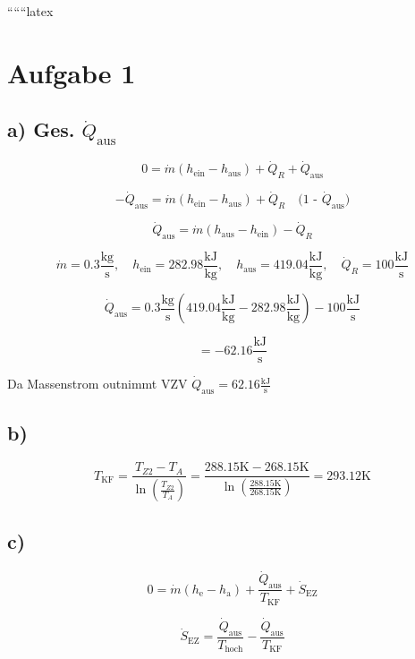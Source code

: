 
``````latex


\section*{Aufgabe 1}

\subsection*{a) Ges. $\dot{Q}_{\text{aus}}$}

\[
0 = \dot{m} (h_{\text{ein}} - h_{\text{aus}}) + \dot{Q}_R + \dot{Q}_{\text{aus}}
\]

\[
-\dot{Q}_{\text{aus}} = \dot{m} (h_{\text{ein}} - h_{\text{aus}}) + \dot{Q}_R \quad \text{(1 - $\dot{Q}_{\text{aus}}$)}
\]

\[
\dot{Q}_{\text{aus}} = \dot{m} (h_{\text{aus}} - h_{\text{ein}}) - \dot{Q}_R
\]

\[
\dot{m} = 0.3 \frac{\text{kg}}{\text{s}}, \quad h_{\text{ein}} = 282.98 \frac{\text{kJ}}{\text{kg}}, \quad h_{\text{aus}} = 419.04 \frac{\text{kJ}}{\text{kg}}, \quad \dot{Q}_R = 100 \frac{\text{kJ}}{\text{s}}
\]

\[
\dot{Q}_{\text{aus}} = 0.3 \frac{\text{kg}}{\text{s}} (419.04 \frac{\text{kJ}}{\text{kg}} - 282.98 \frac{\text{kJ}}{\text{kg}}) - 100 \frac{\text{kJ}}{\text{s}}
\]

\[
= -62.16 \frac{\text{kJ}}{\text{s}}
\]

Da Massenstrom outnimmt VZV $\dot{Q}_{\text{aus}} = 62.16 \frac{\text{kJ}}{\text{s}}$

\subsection*{b)}

\[
T_{\text{KF}} = \frac{T_{Z2} - T_A}{\ln \left( \frac{T_{Z2}}{T_A} \right)} = \frac{288.15 \text{K} - 268.15 \text{K}}{\ln \left( \frac{288.15 \text{K}}{268.15 \text{K}} \right)} = 293.12 \text{K}
\]

\subsection*{c)}

\[
0 = \dot{m} (h_{\text{e}} - h_{\text{a}}) + \frac{\dot{Q}_{\text{aus}}}{T_{\text{KF}}} + \dot{S}_{\text{EZ}}
\]

\[
\dot{S}_{\text{EZ}} = \frac{\dot{Q}_{\text{aus}}}{T_{\text{hoch}}} - \frac{\dot{Q}_{\text{aus}}}{T_{\text{KF}}}
\]

